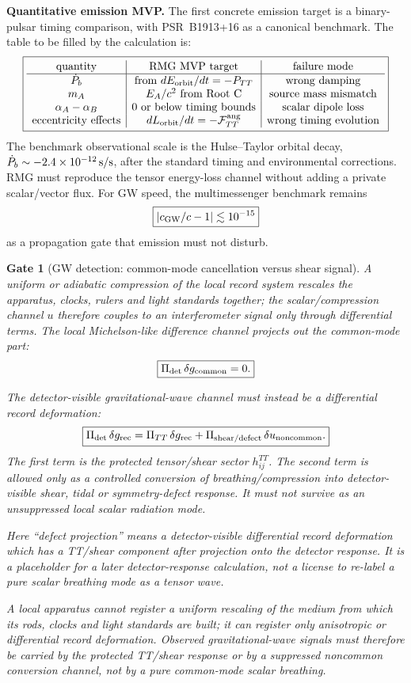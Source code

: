 \documentclass[11pt]{article}
\newtheorem{gate}{Gate}
\begin{document}
\medskip\noindent\textbf{Quantitative emission MVP.}
The first concrete emission target is a binary-pulsar timing comparison, with
PSR~B1913+16 as a canonical benchmark.  The table to be filled by the
calculation is:
\[
\boxed{
\begin{array}{c|c|c}
\text{quantity} & \text{RMG MVP target} & \text{failure mode}\\
\hline
\dot P_b & \text{from }dE_{\rm orbit}/dt=-P_{TT} & \text{wrong damping}\\
m_A & E_A/c^2\text{ from Root C} & \text{source mass mismatch}\\
\alpha_A-\alpha_B & 0\text{ or below timing bounds} & \text{scalar dipole loss}\\
\text{eccentricity effects} & dL_{\rm orbit}/dt=-{\cal F}^{\rm ang}_{TT} &
\text{wrong timing evolution}
\end{array}
}
\]
The benchmark observational scale is the Hulse--Taylor orbital decay,
\(\dot P_b\sim-2.4\times10^{-12}\,{\rm s/s}\), after the standard timing and
environmental corrections.  RMG must reproduce the tensor energy-loss channel
without adding a private scalar/vector flux.  For GW speed, the multimessenger
benchmark remains
\[
\boxed{
\left|c_{\rm GW}/c-1\right|\lesssim10^{-15}
}
\]
as a propagation gate that emission must not disturb.

\begin{gate}[GW detection: common-mode cancellation versus shear signal]
A uniform or adiabatic compression of the local record system rescales the
apparatus, clocks, rulers and light standards together; the scalar/compression
channel \(u\) therefore couples to an interferometer signal only through
differential terms.  The local Michelson-like difference channel projects out
the common-mode part:
\[
\boxed{
\Pi_{\rm det}\,\delta g_{\rm common}=0.
}
\]

The detector-visible gravitational-wave channel must instead be a differential
record deformation:
\[
\boxed{
\Pi_{\rm det}\,\delta g_{\rm rec}
=
\Pi_{TT}\,\delta g_{\rm rec}
+
\Pi_{\mathrm{shear/defect}}\,\delta u_{\rm noncommon}.
}
\]
The first term is the protected tensor/shear sector \(h_{ij}^{TT}\).  The
second term is allowed only as a controlled conversion of breathing/compression
into detector-visible shear, tidal or symmetry-defect response.  It must not
survive as an unsuppressed local scalar radiation mode.

Here ``defect projection'' means a detector-visible differential record
deformation which has a TT/shear component after projection onto the detector
response.  It is a placeholder for a later detector-response calculation, not
a license to re-label a pure scalar breathing mode as a tensor wave.

A local apparatus cannot register a uniform rescaling of the medium from which
its rods, clocks and light standards are built; it can register only
anisotropic or differential record deformation.  Observed gravitational-wave
signals must therefore be carried by the protected TT/shear response or by a
suppressed noncommon conversion channel, not by a pure common-mode scalar
breathing.
\end{gate}
\end{document}
